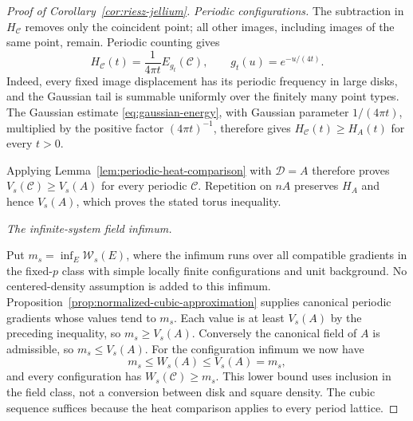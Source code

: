 \begin{proof}[Proof of Corollary~\ref{cor:riesz-jellium}]
\emph{Periodic configurations.}
The subtraction in $H_{\mathcal C}$ removes only the coincident point;
all other images, including images of the same point, remain.
Periodic counting gives
\[
 H_{\mathcal C}(t)=\frac1{4\pi t}E_{g_t}(\mathcal C),
 \qquad g_t(u)=e^{-u/(4t)}.
\]
Indeed, every fixed image displacement has its periodic frequency in large
disks, and the Gaussian tail is summable uniformly over the finitely many
point types.  The Gaussian estimate \eqref{eq:gaussian-energy}, with
Gaussian parameter $1/(4\pi t)$, multiplied by the positive factor
$(4\pi t)^{-1}$, therefore gives $H_{\mathcal C}(t)\ge H_A(t)$
for every $t>0$.

Applying Lemma~\ref{lem:periodic-heat-comparison} with $\mathcal D=A$
therefore proves $V_s(\mathcal C)\ge V_s(A)$ for every periodic
$\mathcal C$. Repetition on $nA$ preserves $H_A$ and hence $V_s(A)$,
which proves the stated torus inequality.

\emph{The infinite-system field infimum.}

Put $m_s=\inf_E\mathcal W_s(E)$, where the infimum runs over all
compatible gradients in the fixed-$p$ class with simple locally finite
configurations and unit background. No centered-density assumption is
added to this infimum.
Proposition~\ref{prop:normalized-cubic-approximation} supplies canonical
periodic gradients whose values tend to $m_s$.  Each value is at least
$V_s(A)$ by the preceding inequality, so $m_s\ge V_s(A)$.
Conversely the canonical field of $A$
is admissible, so $m_s\le V_s(A)$.  For the configuration infimum we now
have
\[
 m_s\le W_s(A)\le V_s(A)=m_s,
\]
and every configuration has $W_s(\mathcal C)\ge m_s$. This lower bound
uses inclusion in the field class, not a conversion between disk and square
density. The cubic sequence suffices because the heat comparison applies to every
period lattice.


\end{proof}
